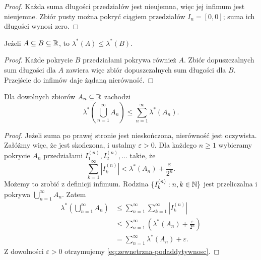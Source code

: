 \begin{proof}
Każda suma długości przedziałów jest nieujemna, więc jej infimum
jest nieujemne. Zbiór pusty można pokryć ciągiem przedziałów
$I_n=[0,0]$; suma ich długości wynosi zero.
\end{proof}

\begin{fakt}
\label{fakt:zewnetrzna-monotonicznosc}
Jeżeli $A\subseteq B\subseteq\mathbb{R}$, to
$\lambda^{\ast}(A)\leq\lambda^{\ast}(B)$.
\end{fakt}

\begin{proof}
Każde pokrycie $B$ przedziałami pokrywa również $A$.
Zbiór dopuszczalnych sum długości dla $A$ zawiera więc zbiór
dopuszczalnych sum długości dla $B$. Przejście do infimów daje
żądaną nierówność.
\end{proof}

\begin{fakt}
\label{fakt:zewnetrzna-podaddytywnosc}
Dla dowolnych zbiorów $A_n\subseteq\mathbb{R}$ zachodzi
\begin{equation}
  \lambda^{\ast}\left(\bigcup_{n=1}^{\infty}A_n\right)
  \leq\sum_{n=1}^{\infty}\lambda^{\ast}(A_n).
  \label{eq:zewnetrzna-podaddytywnosc}
\end{equation}
\end{fakt}

\begin{proof}
Jeżeli suma po prawej stronie jest nieskończona, nierówność jest oczywista.
Załóżmy więc, że jest skończona, i ustalmy $\varepsilon>0$.
Dla każdego $n\geq1$ wybieramy pokrycie $A_n$ przedziałami
$I_1^{(n)},I_2^{(n)},\ldots$ takie, że
\[
  \sum_{k=1}^{\infty}|I_k^{(n)}|
  <\lambda^{\ast}(A_n)+\frac{\varepsilon}{2^n}.
\]
Możemy to zrobić z definicji infimum.
Rodzina $\{I_k^{(n)}:n,k\in\mathbb{N}\}$ jest przeliczalna i pokrywa
$\bigcup_{n=1}^{\infty}A_n$. Zatem
\begin{align*}
  \lambda^{\ast}\left(\bigcup_{n=1}^{\infty}A_n\right)
    &\leq\sum_{n=1}^{\infty}\sum_{k=1}^{\infty}|I_k^{(n)}|\\
    &\leq\sum_{n=1}^{\infty}
      \left(\lambda^{\ast}(A_n)+\frac{\varepsilon}{2^n}\right)\\
    &=\sum_{n=1}^{\infty}\lambda^{\ast}(A_n)+\varepsilon.
\end{align*}
Z dowolności $\varepsilon>0$ otrzymujemy
\eqref{eq:zewnetrzna-podaddytywnosc}.
\end{proof}

